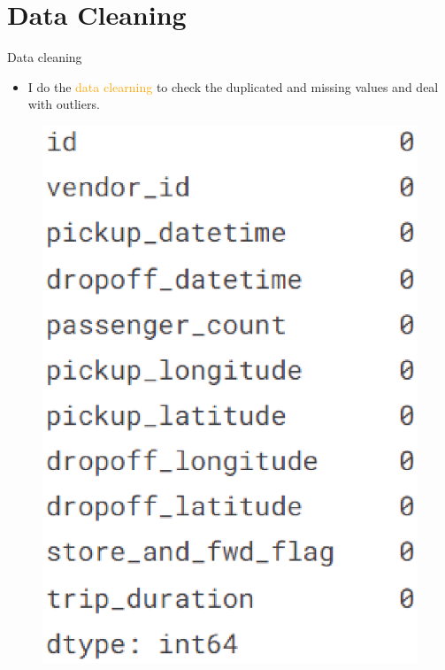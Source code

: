\documentclass[
 size=14pt,
 paper=smartboard,  %
 mode=present, 		%
 display=slides, 	%
 style=tuliplab,  	%
 pauseslide,
 fleqn,leqno]{powerdot}
\begin{document}



\section{Data Cleaning}

\begin{slide}{Data cleaning}
\begin{itemize}
\item
I do the \textcolor{orange}{data clearning} to check the duplicated and missing values and deal with outliers.
\end{itemize}
\vspace{0.75cm}
\begin{figure}
  \centering
   \includegraphics[scale=0.3]{duplicate.eps}

\end{figure}
\end{slide}
\end{document}
